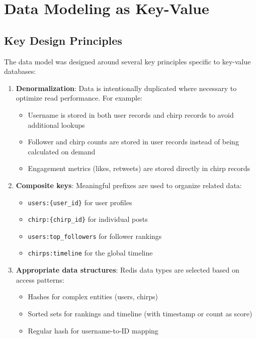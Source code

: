 \documentclass[a4paper,11pt]{article}
\begin{document}
\newpage
\section{Data Modeling as Key-Value}

\subsection{Key Design Principles}
The data model was designed around several key principles specific to key-value databases:

\begin{enumerate}
    \item \textbf{Denormalization}: Data is intentionally duplicated where necessary to optimize read performance. For example:
    \begin{itemize}
        \item Username is stored in both user records and chirp records to avoid additional lookups
        \item Follower and chirp counts are stored in user records instead of being calculated on demand
        \item Engagement metrics (likes, retweets) are stored directly in chirp records
    \end{itemize}
    
    \item \textbf{Composite keys}: Meaningful prefixes are used to organize related data:
    \begin{itemize}
        \item \texttt{users:\{user\_id\}} for user profiles
        \item \texttt{chirp:\{chirp\_id\}} for individual posts
        \item \texttt{users:top\_followers} for follower rankings
        \item \texttt{chirps:timeline} for the global timeline
    \end{itemize}
    
    \item \textbf{Appropriate data structures}: Redis data types are selected based on access patterns:
    \begin{itemize}
        \item Hashes for complex entities (users, chirps)
        \item Sorted sets for rankings and timeline (with timestamp or count as score)
        \item Regular hash for username-to-ID mapping
    \end{itemize}
    

\end{enumerate}
\end{document}
